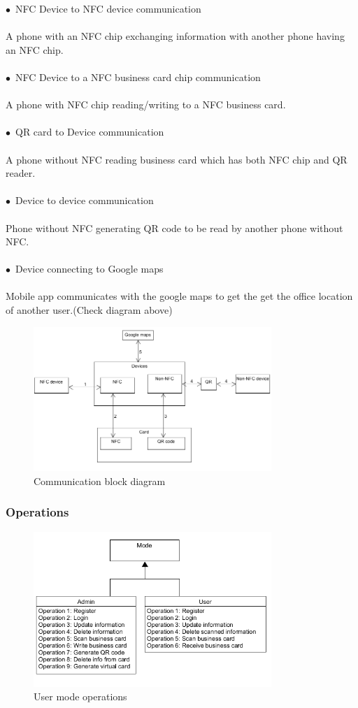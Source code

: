 \documentclass[english]{article}
\begin{document}
$\bullet$\ NFC Device to NFC device communication\\ \\
 A phone with an NFC chip exchanging information with another phone having an NFC chip.\\  \\
$\bullet$\ NFC Device to a NFC business card chip communication\\ \\
 A phone with NFC chip reading/writing to a NFC business card.\\  \\
$\bullet$\ QR card to Device communication\\ \\
A phone without NFC reading business card which has both NFC chip and QR reader.\\ \\
$\bullet$\ Device to device communication\\ \\
 Phone without NFC generating QR code to be read by another phone without NFC.\\ \\
$\bullet$\ Device connecting to Google maps\\ \\
Mobile app communicates with the google maps to get the get the office location of another user.(Check diagram above)

\begin{figure}[ht!]
\centering
\includegraphics[width=90mm]{communication.png}
\caption{Communication block diagram }
\end{figure}

				
\subsubsection{Operations}

\begin{figure}[ht!]
\centering
\includegraphics[width=90mm]{operation2.png}
\caption{User mode operations }
\end{figure}				
\end{document}
